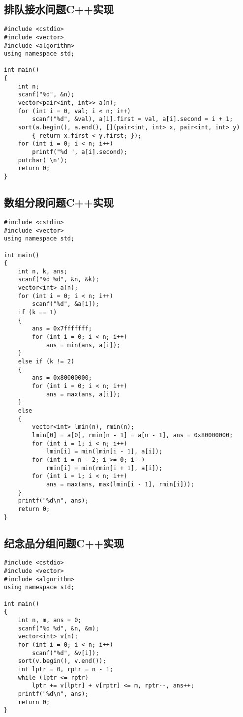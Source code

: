 \documentclass{article}
\begin{document}
\subsection{排队接水问题C++实现}

\begin{lstlisting}
#include <cstdio>
#include <vector>
#include <algorithm>
using namespace std;

int main()
{
    int n;
    scanf("%d", &n);
    vector<pair<int, int>> a(n);
    for (int i = 0, val; i < n; i++)
        scanf("%d", &val), a[i].first = val, a[i].second = i + 1;
    sort(a.begin(), a.end(), [](pair<int, int> x, pair<int, int> y)
        { return x.first < y.first; });
    for (int i = 0; i < n; i++)
        printf("%d ", a[i].second);
    putchar('\n');
    return 0;
}
\end{lstlisting}

\subsection{数组分段问题C++实现}

\begin{lstlisting}
#include <cstdio>
#include <vector>
using namespace std;

int main()
{
    int n, k, ans;
    scanf("%d %d", &n, &k);
    vector<int> a(n);
    for (int i = 0; i < n; i++)
        scanf("%d", &a[i]);
    if (k == 1)
    {
        ans = 0x7fffffff;
        for (int i = 0; i < n; i++)
            ans = min(ans, a[i]);
    }
    else if (k != 2)
    {
        ans = 0x80000000;
        for (int i = 0; i < n; i++)
            ans = max(ans, a[i]);
    }
    else
    {
        vector<int> lmin(n), rmin(n);
        lmin[0] = a[0], rmin[n - 1] = a[n - 1], ans = 0x80000000;
        for (int i = 1; i < n; i++)
            lmin[i] = min(lmin[i - 1], a[i]);
        for (int i = n - 2; i >= 0; i--)
            rmin[i] = min(rmin[i + 1], a[i]);
        for (int i = 1; i < n; i++)
            ans = max(ans, max(lmin[i - 1], rmin[i]));
    }
    printf("%d\n", ans);
    return 0;
}
\end{lstlisting}

\subsection{纪念品分组问题C++实现}

\begin{lstlisting}
#include <cstdio>
#include <vector>
#include <algorithm>
using namespace std;

int main()
{
    int n, m, ans = 0;
    scanf("%d %d", &n, &m);
    vector<int> v(n);
    for (int i = 0; i < n; i++)
        scanf("%d", &v[i]);
    sort(v.begin(), v.end());
    int lptr = 0, rptr = n - 1;
    while (lptr <= rptr)
        lptr += v[lptr] + v[rptr] <= m, rptr--, ans++;
    printf("%d\n", ans);
    return 0;
}
\end{lstlisting}
\end{document}

